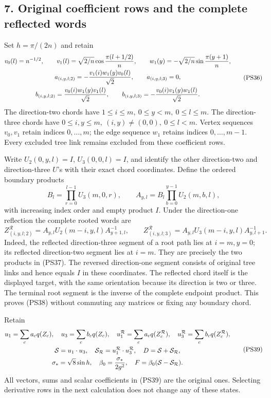 \documentclass[11pt]{article}
\begin{document}
\subsection*{7. Original coefficient rows and the complete reflected words}

Set \(h=\pi/(2n)\) and retain
\[
 \begin{gathered}
 v_0(l)=n^{-1/2},\qquad
 v_1(l)=\sqrt{2/n}\cos{\pi(l+1/2)\over n},\qquad
 w_1(y)=-\sqrt{2/n}\sin{\pi(y+1)\over n},\\
 a_{(i,y,l;2)}=-{v_1(i)w_1(y)v_0(l)\over\sqrt2},\qquad
 a_{(i,y,l;3)}=0,\\
 b_{(i,y,l;2)}={v_0(i)w_1(y)v_1(l)\over\sqrt2},\qquad
 b_{(i,y,l;3)}=-{v_0(i)v_1(y)w_1(l)\over\sqrt2}.
 \end{gathered}
 \tag{PS36}
\]
The direction-two chords have
\(1\le i\le m,\ 0\le y<m,\ 0\le l\le m\).
The direction-three chords have
\(0\le i,y\le m,\ (i,y)\ne(0,0),\ 0\le l<m\).
Vertex sequences \(v_0,v_1\) retain indices \(0,\ldots,m\);
the edge sequence \(w_1\) retains indices \(0,\ldots,m-1\).
Every excluded tree link remains excluded from these coefficient
rows.

Write \(U_2(0,y,l)=I\), \(U_3(0,0,l)=I\), and identify the
other direction-two and direction-three \(U\)'s with their exact
chord coordinates. Define the ordered boundary products
\[
 B_l=\prod_{r=0}^{l-1}U_3(m,0,r),\qquad
 A_{y,l}=B_l\prod_{b=0}^{y-1}U_2(m,b,l),
 \tag{PS37}
\]
with increasing index order and empty product \(I\).
Under the direction-one reflection the complete rooted words are
\[
 Z^{\mathcal R}_{(i,y,l;2)}
   =A_{y,l}U_2(m-i,y,l)A_{y+1,l}^{-1},\qquad
 Z^{\mathcal R}_{(i,y,l;3)}
   =A_{y,l}U_3(m-i,y,l)A_{y,l+1}^{-1}.
 \tag{PS38}
\]
Indeed, the reflected direction-three segment of a root path lies
at \(i=m,y=0\); its reflected direction-two segment lies at
\(i=m\). They are precisely the two products in (PS37). The
reversed direction-one segment consists of original tree links
and hence equals \(I\) in these coordinates. The reflected chord
itself is the displayed target, with the same orientation because
its direction is two or three. The terminal root segment is the
inverse of the complete endpoint product. This proves (PS38)
without commuting any matrices or fixing any boundary chord.

Retain
\[
 \begin{gathered}
 u_1=\sum_ca_cq(Z_c),\quad u_3=\sum_cb_cq(Z_c),\quad
 u_1^{\mathcal R}=\sum_ca_cq(Z_c^{\mathcal R}),\quad
 u_3^{\mathcal R}=\sum_cb_cq(Z_c^{\mathcal R}),\\
 \mathcal S=u_1\cdot u_3,\quad
 \mathcal S_{\mathcal R}=u_1^{\mathcal R}\cdot u_3^{\mathcal R},
 \quad D=\mathcal S+\mathcal S_{\mathcal R},\\
 \sigma_*=\sqrt8\sin h,\quad \beta_0={\sigma_*\over2g^2},
 \quad F=\beta_0(\mathcal S-\mathcal S_{\mathcal R}).
 \end{gathered}
 \tag{PS39}
\]
All vectors, sums and scalar coefficients in (PS39) are the
original ones. Selecting derivative rows in the next calculation
does not change any of these states.
\end{document}
